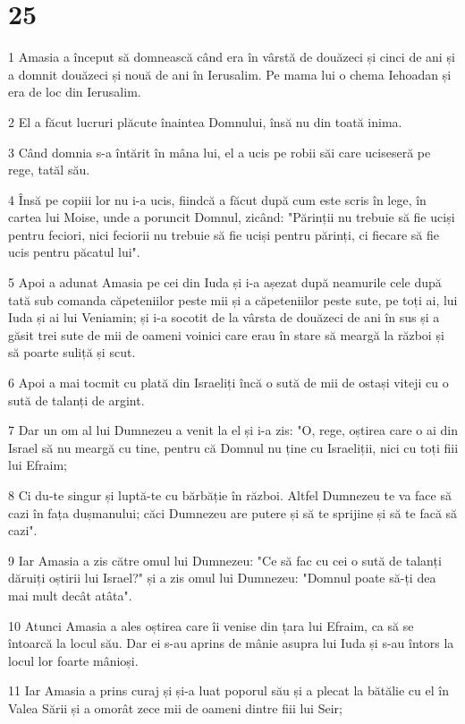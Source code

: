\chapter{25}

\par 1 Amasia a început să domnească când era în vârstă de douăzeci și cinci de ani și a domnit douăzeci și nouă de ani în Ierusalim. Pe mama lui o chema Iehoadan și era de loc din Ierusalim.
\par 2 El a făcut lucruri plăcute înaintea Domnului, însă nu din toată inima.
\par 3 Când domnia s-a întărit în mâna lui, el a ucis pe robii săi care uciseseră pe rege, tatăl său.
\par 4 Însă pe copiii lor nu i-a ucis, fiindcă a făcut după cum este scris în lege, în cartea lui Moise, unde a poruncit Domnul, zicând: "Părinții nu trebuie să fie uciși pentru feciori, nici feciorii nu trebuie să fie uciși pentru părinți, ci fiecare să fie ucis pentru păcatul lui".
\par 5 Apoi a adunat Amasia pe cei din Iuda și i-a așezat după neamurile cele după tată sub comanda căpeteniilor peste mii și a căpeteniilor peste sute, pe toți ai, lui Iuda și ai lui Veniamin; și i-a socotit de la vârsta de douăzeci de ani în sus și a găsit trei sute de mii de oameni voinici care erau în stare să meargă la război și să poarte suliță și scut.
\par 6 Apoi a mai tocmit cu plată din Israeliți încă o sută de mii de ostași viteji cu o sută de talanți de argint.
\par 7 Dar un om al lui Dumnezeu a venit la el și i-a zis: "O, rege, oștirea care o ai din Israel să nu meargă cu tine, pentru că Domnul nu ține cu Israeliții, nici cu toți fiii lui Efraim;
\par 8 Ci du-te singur și luptă-te cu bărbăție în război. Altfel Dumnezeu te va face să cazi în fața dușmanului; căci Dumnezeu are putere și să te sprijine și să te facă să cazi".
\par 9 Iar Amasia a zis către omul lui Dumnezeu: "Ce să fac cu cei o sută de talanți dăruiți oștirii lui Israel?" și a zis omul lui Dumnezeu: "Domnul poate să-ți dea mai mult decât atâta".
\par 10 Atunci Amasia a ales oștirea care îi venise din țara lui Efraim, ca să se întoarcă la locul său. Dar ei s-au aprins de mânie asupra lui Iuda și s-au întors la locul lor foarte mânioși.
\par 11 Iar Amasia a prins curaj și și-a luat poporul său și a plecat la bătălie cu el în Valea Sării și a omorât zece mii de oameni dintre fiii lui Seir;
